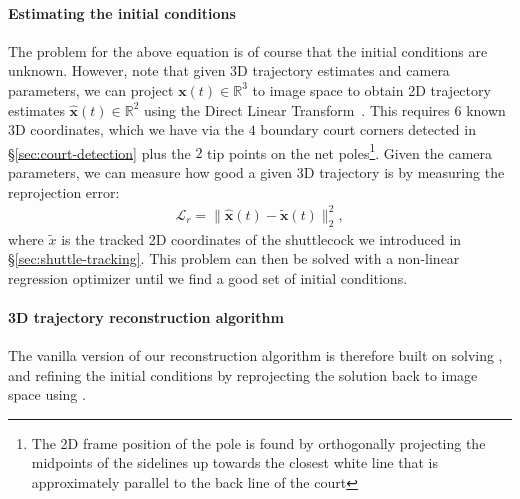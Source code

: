\paragraph{Estimating the initial conditions}
The problem for the above equation is of course that the initial conditions are unknown. However, note that given 3D trajectory estimates and camera parameters, we can project $\boldsymbol{x}(t) \in \mathbb{R}^3$ to image space to obtain 2D trajectory estimates $\boldsymbol{\hat{x}}(t) \in \mathbb{R}^2$ using the Direct Linear Transform~\cite{abdel2015direct}. This requires $6$ known 3D coordinates, which we have via the $4$ boundary court corners detected in \S\ref{sec:court-detection} plus the $2$ tip points on the net poles\footnote{The 2D frame position of the pole is found by orthogonally projecting the midpoints of the sidelines up towards the closest white line that is approximately parallel to the back line of the court}. Given the camera parameters, we can measure how good a given 3D trajectory is by measuring the reprojection error:
\begin{align}
\label{eq:reprojection_loss}
    \mathcal{L}_r = \|\boldsymbol{\hat{x}}(t) - \boldsymbol{\tilde{x}}(t)\|^2_2,
\end{align}
where $\tilde{x}$ is the tracked 2D coordinates of the shuttlecock we introduced in \S\ref{sec:shuttle-tracking}. This problem can then be solved with a non-linear regression optimizer until we find a good set of initial conditions.

\paragraph{3D trajectory reconstruction algorithm}

The vanilla version of our reconstruction algorithm is therefore built on solving , and refining the initial conditions by reprojecting the solution back to image space using . 

